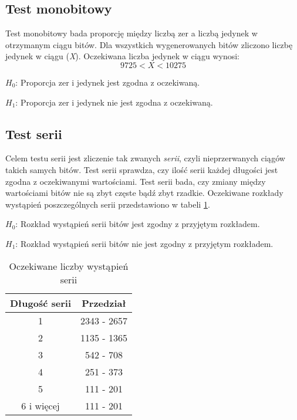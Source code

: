\subsection{Test monobitowy}
\label{monbitOpis}
Test monobitowy bada proporcję między liczbą zer a liczbą jedynek w otrzymanym ciągu bitów. Dla wszystkich 
wygenerowanych bitów zliczono liczbę jedynek w ciągu (\textit{X}). Oczekiwana liczba jedynek w ciągu wynosi:
\begin{displaymath}
    9725 < X < 10275
\end{displaymath}
\par \begin{math} H_0 \end{math}: Proporcja zer i jedynek jest zgodna z oczekiwaną.
\par \begin{math} H_1 \end{math}: Proporcja zer i jedynek nie jest zgodna z oczekiwaną.

\subsection{Test serii}
Celem testu serii jest zliczenie tak zwanych \textit{serii}, czyli nieprzerwanych ciągów takich samych bitów. Test serii
sprawdza, czy ilość serii każdej długości jest zgodna z oczekiwanymi wartościami. Test serii bada, czy zmiany między 
wartościami bitów nie są zbyt częste bądź zbyt rzadkie. Oczekiwane rozkłady wystąpień poszczególnych serii przedstawiono
w tabeli \ref{serieOczekiwane}.
\par \begin{math} H_0 \end{math}: Rozkład wystąpień serii bitów jest zgodny z przyjętym rozkładem.
\par \begin{math} H_1 \end{math}: Rozkład wystąpień serii bitów nie jest zgodny z przyjętym rozkładem.
\begin{table}[h]
    \centering
    \caption{Oczekiwane liczby wystąpień serii}
    \label{serieOczekiwane}
    \begin{tabular}{|c|c|} 
        \hline
        Długość serii & Przedział \\
        \hline
        1 & 2343 - 2657 \\
        \hline
        2 & 1135 - 1365 \\
        \hline
        3 & 542 - 708 \\
        \hline
        4 & 251 - 373 \\
        \hline
        5 & 111 - 201 \\
        \hline
        6 i więcej & 111 - 201 \\
        \hline  
    \end{tabular} 
\end{table}   
